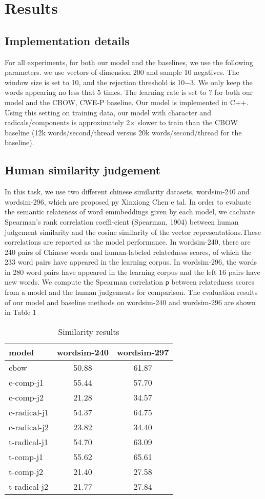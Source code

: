 \section{Results}
\subsection{Implementation details}
For all experiments, for both our model and the baselines, we use the following parameters. we use vectors of dimension 200 and sample 10 negatives. The window size is set to 10, and the rejection threshold is 10−3. We only keep the words appearing no less that 5 times. The learning rate is set to ? for both our model and the CBOW, CWE-P baseline. Our model is implemented in C++.
Using this setting on training data, our model with character and radicals/components is approximately 2× slower to train than the CBOW baseline (12k words/second/thread versus 20k words/second/thread for the baseline). 

\subsection{Human similarity judgement} 
In this task, we use two different chinese similarity datasets, wordsim-240 and wordsim-296, which are proposed py Xinxiong Chen e tal. In order to evaluate the semantic relateness of word emmbeddings given by each model, we cacluate Spearman’s rank correlation coeffi-cient (Spearman, 1904) between human judgement similarity and the cosine similarity of the vector representations.These correlations are reported as the model performance. 
In wordsim-240, there are 240 pairs of Chinese words and human-labeled relatedness scores, of which the 233 word pairs have appeared in the learning corpus. In wordsim-296, the words in 280 word pairs have appeared in the learning corpus and the left 16 pairs have new words.
We compute the Spearman correlation ρ between relatedness scores from a model and the human judgements for comparison. The evaluation results of our model and baseline methods on wordsim-240 and wordsim-296 are shown in Table 1
\begin{table}[h]
\begin{center}
\begin{tabular}{lcc}
\hline \bf model & \bf wordsim-240 & \bf wordsim-297 \\ \hline
cbow & 50.88 & 61.87 \\
c-comp-j1 & 55.44 & 57.70\\
c-comp-j2 & 21.28 & 34.57 \\
c-radical-j1 & 54.37 & 64.75 \\
c-radical-j2 & 23.82  & 34.40\\
t-radical-j1  & 54.70 & 63.09\\
t-comp-j1  & 55.62 & 65.61\\
t-comp-j2 & 21.40 & 27.58\\
t-radical-j2 & 21.77 & 27.84\\
\hline
\end{tabular}
\end{center}
\caption{\label{font-table} Similarity results }
\end{table}

